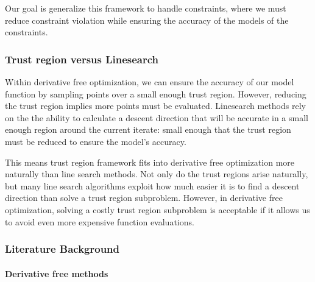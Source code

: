 \documentclass{article}
\begin{document}
Our goal is generalize this framework to handle constraints, where we must reduce constraint violation while ensuring the accuracy of the models of the constraints.


\subsubsection{Trust region versus Linesearch} \label{linevsmodel}

Within derivative free optimization, we can ensure the accuracy of our model function by sampling points over a small enough trust region.
However, reducing the trust region implies more points must be evaluated.
Linesearch methods rely on the the ability to calculate a descent direction that will be accurate in a small enough region around the current iterate:
small enough that the trust region must be reduced to ensure the model's accuracy.

This means trust region framework fits into derivative free optimization more naturally than line search methods.
Not only do the trust regions arise naturally, but many line search algorithms exploit how much easier it is to find a descent direction than solve a trust region subproblem.
However, in derivative free optimization, solving a costly trust region subproblem is acceptable if it allows us to avoid even more expensive function evaluations.





\subsubsection{Literature Background}

\paragraph{Derivative free methods}
\end{document}

